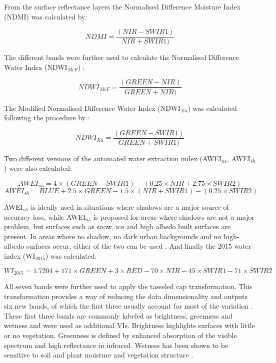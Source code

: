 \documentclass[12pt,a4paper, twoside, english]{article}
\begin{document}
From the surface reflectance layers the Normalised Difference Moisture Index (NDMI) \citep{Jin2005} was calculated by:

\begin{equation}
\label{eq:ndmi}
NDMI = \frac{(NIR - SWIR1)}{NIR + SWIR1)}
\end{equation}

\newpage
The different bands were further used to calculate the Normalised Difference Water Index (NDWI$_{McF}$) \citep{McFeeters1996}:

\begin{equation}
\label{eq:ndwi_mcf}
NDWI_{McF} = \frac{(GREEN - NIR)}{GREEN + NIR)}
\end{equation}

The Modified Normalised Difference Water Index (NDWI$_{Xu}$) was calculated following the procedure by \cite{Xu2006a}:

\begin{equation}
\label{eq:ndwi_xu}
NDWI_{Xu} = \frac{(GREEN - SWIR1)}{GREEN + SWIR1)}
\end{equation}

Two different versions of the automated water extraction index (AWEI$_{ns}$, AWEI$_{sh}$) were also calculated:

\begin{equation}
\label{eq:awei_ns}
AWEI_{ns} = 4\times(GREEN - SWIR1) - (0.25\times NIR + 2.75\times SWIR2)
\end{equation}
\begin{equation}
\label{eq:awei_sh}
AWEI_{sh} = BLUE + 2.5\times GREEN - 1.5\times(NIR + SWIR1) - (0.25\times SWIR2)
\end{equation}

AWEI$_{sh}$ is ideally used in situations where shadows are a major source of accuracy loss, while AWEI$_{ns}$ is proposed for areas where shadows are not a major problem, but surfaces such as snow, ice and high albedo built surfaces are present. In areas where no shadow, no dark urban backgrounds and no high-albedo surfaces occur, either of the two can be used \citep{Feyisa2014}.
And finally the 2015 water index (WI$_{2015}$) \citep{Fisher2016} was calculated:

\begin{equation}
\label{eq:wi_2015}
WI_{2015} = 1.7204 + 171\times GREEN + 3\times RED - 70\times NIR - 45\times SWIR1 - 71\times SWIR2
\end{equation}

All seven bands were further used to apply the tasseled cap transformation. This transformation provides a way of reducing the data dimensionality and outputs six new bands, of which the first three usually account for most of the variation \citep{Crist1984}. These first three bands are commonly labeled as brightness, greenness and wetness and were used as additional VIs. Brightness highlights surfaces with little or no vegetation. Greenness is defined by enhanced absorption of the visible spectrum and high reflectance in infrared. Wetness has been shown to be sensitive to soil and plant moisture \citep{Crist1984} and vegetation structure \citep{Jin2005, Vorovencii2007}.
\end{document}
